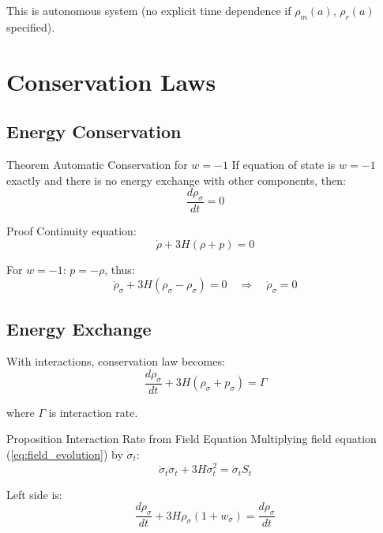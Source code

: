 \documentclass[11pt,a4paper]{article}
\theoremstyle{definition}
\theoremstyle{remark}
\begin{document}
	This is autonomous system (no explicit time dependence if $\rho_m(a)$, $\rho_r(a)$ specified).
	
	\section{Conservation Laws}
	
	\subsection{Energy Conservation}
	
	Theorem Automatic Conservation for $w = -1$
		If equation of state is $w = -1$ exactly and there is no energy exchange with other components, then:
		\begin{equation}
			\frac{d\rho_\sigma}{dt} = 0
		\end{equation}
	
	Proof
		Continuity equation:
		\begin{equation}
			\dot{\rho} + 3H(\rho + p) = 0
		\end{equation}
		
		For $w = -1$: $p = -\rho$, thus:
		\begin{equation}
			\dot{\rho}_\sigma + 3H(\rho_\sigma - \rho_\sigma) = 0 \quad \Rightarrow \quad \dot{\rho}_\sigma = 0
		\end{equation}
	
	\subsection{Energy Exchange}
	
	With interactions, conservation law becomes:
	\begin{equation}
		\frac{d\rho_\sigma}{dt} + 3H(\rho_\sigma + p_\sigma) = \Gamma
	\end{equation}
	
	where $\Gamma$ is interaction rate.
	
	Proposition Interaction Rate from Field Equation
		Multiplying field equation (\ref{eq:field_evolution}) by $\dot{\sigma}_t$:
		\begin{equation}
			\dot{\sigma}_t\ddot{\sigma}_t + 3H\dot{\sigma}_t^2 = \dot{\sigma}_t S_t
		\end{equation}
		
		Left side is:
		\begin{equation}
			\frac{d\rho_\sigma}{dt} + 3H\rho_\sigma(1 + w_\sigma) = \frac{d\rho_\sigma}{dt}
		\end{equation}
		
\end{document}
